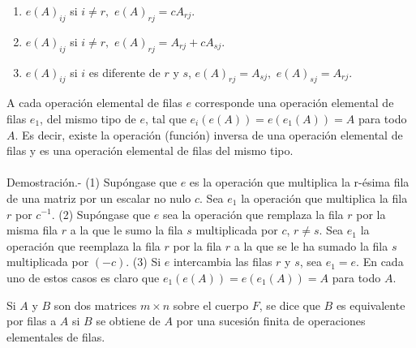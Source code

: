 \begin{tcolorbox}
    \begin{enumerate}[\bfseries 1.]
	\item $e(A)_{ij}$ si $i\neq r,$ $e(A)_{rj}=cA_{rj}$.
	\item $e(A)_{ij}$ si $i\neq r,$ $e(A)_{rj}=A_{rj}+cA_{sj}.$
	\item $e(A)_{ij}$ si $i$ es diferente de $r$ y $s$, $e(A)_{rj}=A_{sj},$ $e(A)_{sj}=A_{rj}.$
    \end{enumerate}
\end{tcolorbox}

\begin{teo}
    A cada operación elemental de filas $e$ corresponde una operación elemental de filas $e_1$, del mismo tipo de $e$, tal que $e_i(e(A))=e(e_1(A))=A$ para todo $A$. Es decir, existe la operación (función) inversa de una operación elemental de filas y es una operación elemental de filas del mismo tipo.\\\\
    Demostración.-\; (1) Supóngase que $e$ es la operación que multiplica la r-ésima fila de una matriz por un escalar no nulo $c$. Sea $e_1$ la operación que multiplica la fila $r$ por $c^{-1}$. (2) Supóngase que $e$ sea la operación que remplaza la fila $r$ por la misma fila $r$ a la que le sumo la fila $s$ multiplicada por $c$, $r\neq s$. Sea $e_1$ la operación que reemplaza la fila $r$ por la fila $r$ a la que se le ha sumado la fila $s$ multiplicada por $(-c)$. (3) Si $e$ intercambia las filas $r$ y $s$, sea $e_1=e$. En cada uno de estos casos es claro que $e_1(e(A))=e(e_1(A))=A$ para todo $A$.
\end{teo}

\begin{tcolorbox}
    \begin{def.}
	Si $A$ y $B$ son dos matrices $m\times n$ sobre el cuerpo $F$, se dice que $B$ es equivalente por filas a $A$ si $B$ se obtiene de $A$ por una sucesión finita de operaciones elementales de filas.
    \end{def.}
\end{tcolorbox}


